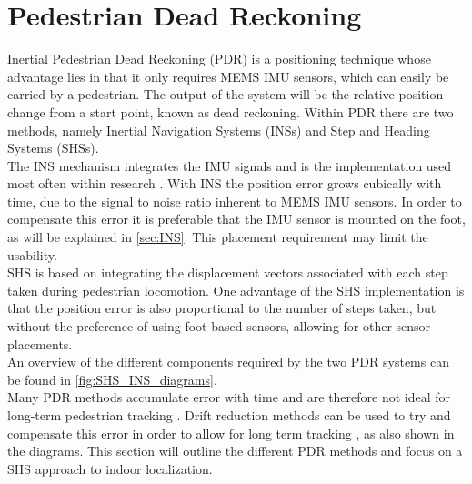 \section{Pedestrian Dead Reckoning}
Inertial Pedestrian Dead Reckoning (PDR) is a positioning technique whose advantage lies in that it only requires MEMS IMU sensors, which can easily be carried by a pedestrian. The output of the system will be the relative position change from a start point, known as dead reckoning. Within PDR there are two methods, namely Inertial Navigation Systems (INSs) and Step and Heading Systems (SHSs).\\
The INS mechanism integrates the IMU signals and is the implementation used most often within research \cite{Diez2018b}. With INS the position error grows cubically with time, due to the signal to noise ratio inherent to MEMS IMU sensors\cite{Harle2013}. In order to compensate this error it is preferable  that the IMU sensor is mounted on the foot, as will be explained in \cref{sec:INS}. This placement requirement may limit the usability. \\
SHS is based on integrating the displacement vectors associated with each step taken during pedestrian locomotion. One advantage of the SHS implementation is that the position error is also proportional to the number of steps taken, but without the preference of using foot-based sensors, allowing for other sensor placements. \\
An overview of the different components required by the two PDR systems can be found in \cref{fig:SHS_INS_diagrams}.\\ Many PDR methods accumulate error with time and are therefore not ideal for long-term pedestrian tracking \cite{Hardegger2012}. Drift reduction methods can be used to try and compensate this error in order to allow for long term tracking \cite{MunozDiaz2019a}, as also shown in the diagrams. This section will outline the different PDR methods and focus on a SHS approach to indoor localization.

